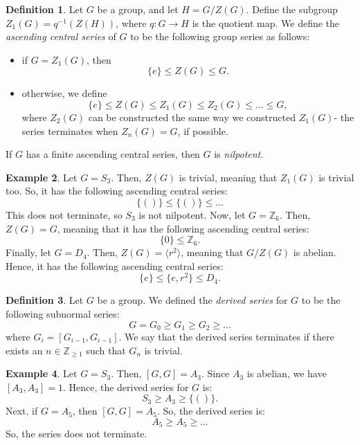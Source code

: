 \documentclass[a4paper, openany]{memoir}
\theoremstyle{definition}
\newtheorem{definition}{Definition}[section]
\newtheorem{example}[definition]{Example}
\theoremstyle{plain}
\begin{document}
    \begin{definition}
        Let $G$ be a group, and let $H = G/Z(G)$. Define the subgroup $Z_1(G) = q^{-1}(Z(H))$, where $q \colon G \to H$ is the quotient map. We define the \emph{ascending central series} of $G$ to be the following group series as follows:
        \begin{itemize}
            \item if $G = Z_1(G)$, then
            \[\{e\} \leq Z(G) \leq G.\]
            \item otherwise, we define
            \[\{e\} \leq Z(G) \leq Z_1(G) \leq Z_2(G) \leq \dots \leq G,\]
            where $Z_2(G)$ can be constructed the same way we constructed $Z_1(G)$- the series terminates when $Z_n(G) = G$, if possible.
        \end{itemize}
        If $G$ has a finite ascending central series, then $G$ is \emph{nilpotent}.
    \end{definition}

    \begin{example}
        Let $G = S_3$. Then, $Z(G)$ is trivial, meaning that $Z_1(G)$ is trivial too. So, it has the following ascending central series:
        \[\{()\} \leq \{()\}  \leq \dots \]
        This does not terminate, so $S_3$ is not nilpotent. Now, let $G = \mathbb{Z}_6$. Then, $Z(G) = G$, meaning that it has the following ascending central series:
        \[\{0\} \leq \mathbb{Z}_6.\]
        Finally, let $G = D_4$. Then, $Z(G) = \langle r^2 \rangle$, meaning that $G/Z(G)$ is abelian. Hence, it has the following ascending central series:
        \[\{e\} \leq \{e, r^2\} \leq D_4.\]
    \end{example}

    \begin{definition}
        Let $G$ be a group. We defined the \emph{derived series} for $G$ to be the following subnormal series:
        \[G = G_0 \geq G_1 \geq G_2 \geq \dots\]
        where $G_i = [G_{i-1}, G_{i-1}]$. We say that the derived series terminates if there exists an $n \in \mathbb{Z}_{\geq 1}$ such that $G_n$ is trivial.
    \end{definition}

    \begin{example}
        Let $G = S_3$. Then, $[G, G] = A_3$. Since $A_3$ is abelian, we have $[A_3, A_3] = 1$. Hence, the derived series for $G$ is:
        \[S_3 \geq A_3 \geq \{()\}.\]
        Next, if $G = A_5$, then $[G, G] = A_5$. So, the derived series is:
        \[A_5 \geq A_5 \geq \dots\]
        So, the series does not terminate.
    \end{example}
\end{document}
